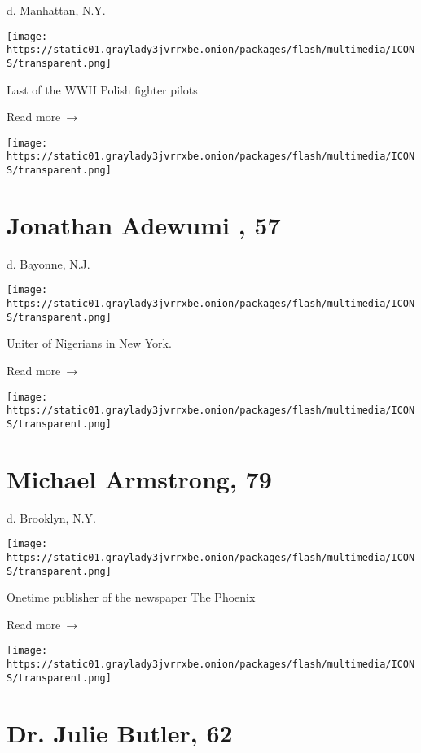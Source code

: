 d. Manhattan, N.Y.

\texttt{[image: https://static01.graylady3jvrrxbe.onion/packages/flash/multimedia/ICONS/transparent.png]}

Last of the WWII Polish fighter pilots

 Read more~→

\href{https://www.nytimes3xbfgragh.onion/2020/05/14/obituaries/jonathan-adewumi-dies-coronavirus.html}{}

\texttt{[image: https://static01.graylady3jvrrxbe.onion/packages/flash/multimedia/ICONS/transparent.png]}

\hypertarget{jonathan-adewumi--57}{%
\section{Jonathan Adewumi , 57}\label{jonathan-adewumi--57}}

d. Bayonne, N.J.

\texttt{[image: https://static01.graylady3jvrrxbe.onion/packages/flash/multimedia/ICONS/transparent.png]}

Uniter of Nigerians in New York.

 Read more~→

\href{https://www.nytimes3xbfgragh.onion/2020/05/13/obituaries/michael-armstrong-dead-coronavirus.html}{}

\texttt{[image: https://static01.graylady3jvrrxbe.onion/packages/flash/multimedia/ICONS/transparent.png]}

\hypertarget{michael-armstrong-79}{%
\section{Michael Armstrong, 79}\label{michael-armstrong-79}}

d. Brooklyn, N.Y.

\texttt{[image: https://static01.graylady3jvrrxbe.onion/packages/flash/multimedia/ICONS/transparent.png]}

Onetime publisher of the newspaper The Phoenix

 Read more~→

\href{https://www.nytimes3xbfgragh.onion/2020/05/12/obituaries/dr-julie-butler-dead-coronavirus.html}{}

\texttt{[image: https://static01.graylady3jvrrxbe.onion/packages/flash/multimedia/ICONS/transparent.png]}

\hypertarget{dr-julie-butler-62}{%
\section{Dr. Julie Butler, 62}\label{dr-julie-butler-62}}

